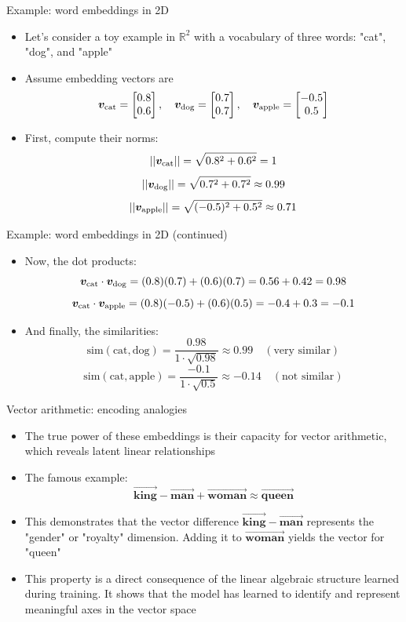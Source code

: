 \documentclass[aspectratio=169]{beamer}\usepackage[]{graphicx}\usepackage[]{xcolor}
\begin{document}
\begin{frame}{Example: word embeddings in 2D}
\begin{itemize}
\item Let's consider a toy example in $\mathbb{R}^2$ with a vocabulary of three words: "cat", "dog", and "apple"
\vfill
\item Assume embedding vectors are
  $$ \bm{v}_{\text{cat}} = \begin{bmatrix} 0.8 \\ 0.6 \end{bmatrix}, \quad \bm{v}_{\text{dog}} = \begin{bmatrix} 0.7 \\ 0.7 \end{bmatrix}, \quad \bm{v}_{\text{apple}} = \begin{bmatrix} -0.5 \\ 0.5 \end{bmatrix} $$
\vfill
\item First, compute their norms:
  $$ ||\bm{v}_{\text{cat}}|| = \sqrt{0.8^2 + 0.6^2} = 1 $$
  $$ ||\bm{v}_{\text{dog}}|| = \sqrt{0.7^2 + 0.7^2} \approx 0.99 $$
  $$ ||\bm{v}_{\text{apple}}|| = \sqrt{(-0.5)^2 + 0.5^2} \approx 0.71 $$
\end{itemize}


\end{frame}
\begin{frame}{Example: word embeddings in 2D (continued)}
\begin{itemize}
\item Now, the dot products:
  $$ \bm{v}_{\text{cat}} \cdot \bm{v}_{\text{dog}} = (0.8)(0.7) + (0.6)(0.7) = 0.56 + 0.42 = 0.98 $$
  $$ \bm{v}_{\text{cat}} \cdot \bm{v}_{\text{apple}} = (0.8)(-0.5) + (0.6)(0.5) = -0.4 + 0.3 = -0.1 $$
\vfill
\item And finally, the similarities:
  $$ \text{sim}(\text{cat}, \text{dog}) = \frac{0.98}{1 \cdot \sqrt{0.98}} \approx 0.99 \quad (\text{very similar}) $$
  $$ \text{sim}(\text{cat}, \text{apple}) = \frac{-0.1}{1 \cdot \sqrt{0.5}} \approx -0.14 \quad (\text{not similar}) $$
\end{itemize}
\end{frame}

\begin{frame}{Vector arithmetic: encoding analogies}
\begin{itemize}
\item The true power of these embeddings is their capacity for vector arithmetic, which reveals latent linear relationships
\vfill
\item The famous example:
  $$ \vec{\textbf{king}} - \vec{\textbf{man}} + \vec{\textbf{woman}} \approx \vec{\textbf{queen}} $$
\vfill
\item This demonstrates that the vector difference $\vec{\textbf{king}} - \vec{\textbf{man}}$ represents the "gender" or "royalty" dimension. Adding it to $\vec{\textbf{woman}}$ yields the vector for "queen"
\vfill
\item This property is a direct consequence of the linear algebraic structure learned during training. It shows that the model has learned to identify and represent meaningful axes in the vector space
\end{itemize}
\end{frame}
\end{document}
